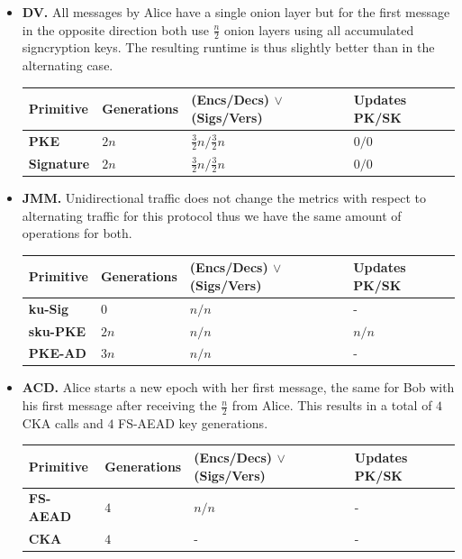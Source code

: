 \documentclass[11pt,a4paper,twoside,openright,bibliography=totoc]{scrbook}
\begin{document}
\begin{itemize}
\item \textbf{DV.} All messages by Alice have a single onion layer but for
  the first message in the opposite direction both use $\frac{n}{2}$ onion
  layers using all accumulated signcryption keys. The resulting runtime
  is thus slightly better than in the alternating case.
  \begin{center}
    \begin{tabular}{ | l | l | l | l |}
    \hline
    Primitive & Generations & (Encs/Decs) $\vee$ (Sigs/Vers) & Updates PK/SK \\ \hline
    \textbf{PKE} & $2n$ & $\frac{3}{2}n/\frac{3}{2}n$ & $0/0$ \\ \hline
    \textbf{Signature} & $2n$ & $\frac{3}{2}n/\frac{3}{2}n$ & $0/0$ \\  
    \hline
    \end{tabular}
  \end{center}
\item \textbf{JMM.} Unidirectional traffic does not change the metrics
  with respect to alternating traffic for this protocol thus we have the
  same amount of operations for both.
  \begin{center}
    \begin{tabular}{ | l | l | l | l |}
    \hline
    Primitive & Generations & (Encs/Decs) $\vee$ (Sigs/Vers) & Updates PK/SK \\ \hline
    \textbf{ku-Sig} & $0$ & $n/n$ & - \\ \hline
    \textbf{sku-PKE} & $2n$ & $n/n$ & $n/n$ \\ \hline
    \textbf{PKE-AD} & $3n$ & $n/n$ & - \\
    \hline
    \end{tabular}
  \end{center}
\item \textbf{ACD.} Alice starts a new epoch with her first message, the
  same for Bob with his first message after receiving the $\frac{n}{2}$
  from Alice. This results in a total of $4$ CKA calls and $4$ FS-AEAD
  key generations.
  \begin{center}
    \begin{tabular}{ | l | l | l | l |}
    \hline
    Primitive & Generations & (Encs/Decs) $\vee$ (Sigs/Vers) & Updates PK/SK \\ \hline
    \textbf{FS-AEAD} & $4$ & $n/n$ & - \\ \hline
    \textbf{CKA} & $4$ & - & - \\  
    \hline
    \end{tabular}
  \end{center}
\end{itemize}
\end{document}

